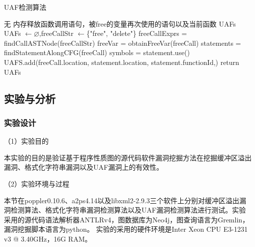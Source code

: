 {\begin{algorithm}
	\renewcommand{\algorithmicrequire}{\textbf{Input:}}
	\renewcommand{\algorithmicensure}{\textbf{Output:}}
	\caption{UAF检测算法}
	\label{UAF检测算法}
	\begin{algorithmic}[1]
		\REQUIRE 无
		\ENSURE 内存释放函数调用语句，被free的变量再次使用的语句以及当前函数 UAFs
		\STATE UAFs $\leftarrow \varnothing$,freeCallStr $\leftarrow$\{"free", "delete"\}
		\STATE freeCallExprs = findCallASTNode(freeCallStr)
			\STATE freeVar = obtainFreeVar(freeCall)
			\STATE statements = findStatementAlongCFG(freeCall)
				\STATE symbols = statement.use()
					\STATE UAFS.add(freeCall.location, statement.location, statement.functionId,)
				\ENDIF
			\ENDFOR
		\ENDFOR
	\STATE return UAFs	
	\end{algorithmic}
\end{algorithm}



\subsection{实验与分析}

\subsubsection{实验设计}
（1）实验目的

本实验的目的是验证基于程序性质图的源代码软件漏洞挖掘方法在挖掘缓冲区溢出漏洞、格式化字符串漏洞以及UAF漏洞上的有效性。

（2）实验环境与过程

本节在poppler0.10.6、a2ps4.14以及libxml2-2.9.3三个软件上分别对缓冲区溢出漏洞检测算法、格式化字符串漏洞检测算法以及UAF漏洞检测算法进行测试。实验采用的源代码语法解析器ANTLRv4，图数据库为Neo4j，图查询语言为Gremlin，漏洞挖掘脚本语言为python。
实验的采用的硬件环境是Inter Xeon CPU E3-1231 v3 @ 3.40GHz，16G RAM。

}
